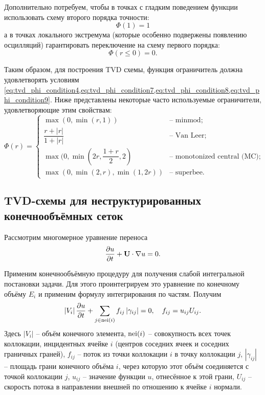 Дополнительно потребуем, чтобы в точках с гладким поведением функции использовать схему второго порядка точности:
\begin{equation}
\label{eq:tvd_phi_condition8}
\Phi(1) = 1
\end{equation}
а в точках локального экстремума (которые особенно подвержены появлению осцилляций) гарантировать переключение на схему первого порядка:
\begin{equation}
\label{eq:tvd_phi_condition9}
\Phi(r\leq0) = 0.
\end{equation}

Таким образом, для построения TVD схемы, функция ограничитель должна удовлетворять условиям
\cref{eq:tvd_phi_condition4,eq:tvd_phi_condition7,eq:tvd_phi_condition8,eq:tvd_phi_condition9}.
Ниже представлены некоторые часто используемые ограничители, удовлетворяющие этим свойствам:
\begin{equation}
\label{eq:tvd_limiter}
\Phi(r) = \left\{
\begin{array}{ll}
\max(0, \min(r, 1))                   & \text{-- minmod};\\[10pt]
\dfrac{r + |r|}{1+|r|}                & \text{-- Van Leer}; \\[10pt]
\max(0, \min(2r, \dfrac{1+r}{2}, 2)   & \text{-- monotonized central (MC)}; \\[10pt]
\max(0, \min(2, r), \min(1, 2 r))     & \text{-- superbee}.
\end{array}
\right.
\end{equation}

\subsection{TVD-схемы для неструктурированных конечнообъёмных сеток}
Рассмотрим многомерное уравнение переноса
\begin{equation}
\nonumber
\frac{\partial u}{\partial t} + \boldsymbol{\rm U} \cdot \nabla u = 0.
\end{equation}

Применим конечнообъёмную процедуру
для получения слабой интегральной постановки задачи.
Для этого проинтегрируем это уравнение
по конечному объёму $E_i$ 
и применим формулу интегрирования по частям.
Получим
\begin{equation}
\label{eq:tvd_fvm_transport}
\left| V_i \right|
\frac{\partial u}{\partial t}
+ \sum_{j\in {\rm nei}(i)} {f_{ij} \left|\gamma_{ij}\right|}
= 0, \quad f_{ij} = u_{ij} U_{ij}.
\end{equation}
Здесь $|V_i|$ -- объём конечного элемента,
${\rm nei}(i)$ -- совокупность
всех точек коллокации, инцидентных ячейке $i$
(центров соседних ячеек и соседних граничных граней),
$f_{ij}$ -- поток из точки коллокации $i$ в точку коллокации $j$,
$|\gamma_{ij}|$ --
площадь грани
конечного объёма $i$, через
которую этот объём соединяется с точкой коллокации $j$,
$u_{ij}$ -- значение функции $u$, отнесённое к этой грани,
$U_{ij}$ -- скорость потока в направлении внешней по отношению
к ячейке $i$ нормали.

